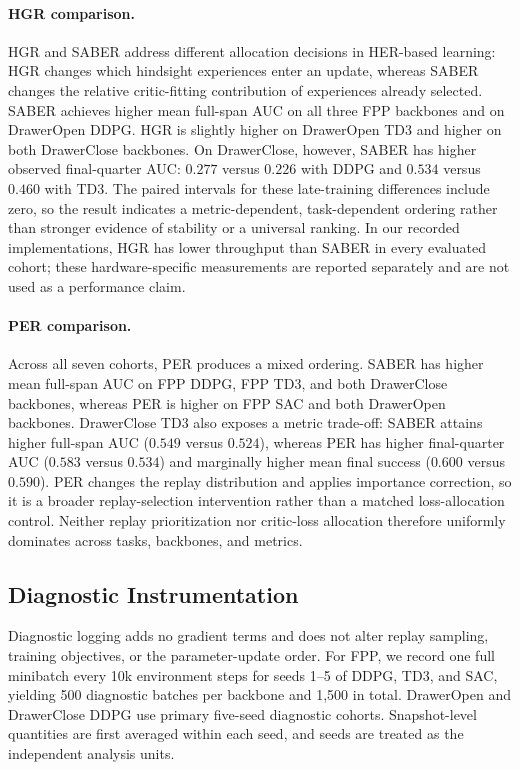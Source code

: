 \documentclass[letterpaper]{article}
\begin{document}
\paragraph{HGR comparison.}
HGR and SABER address different allocation decisions in HER-based learning: HGR changes which hindsight experiences enter an update, whereas SABER changes the relative critic-fitting contribution of experiences already selected. SABER achieves higher mean full-span AUC on all three FPP backbones and on DrawerOpen DDPG. HGR is slightly higher on DrawerOpen TD3 and higher on both DrawerClose backbones. On DrawerClose, however, SABER has higher observed final-quarter AUC: \(0.277\) versus \(0.226\) with DDPG and \(0.534\) versus \(0.460\) with TD3. The paired intervals for these late-training differences include zero, so the result indicates a metric-dependent, task-dependent ordering rather than stronger evidence of stability or a universal ranking. In our recorded implementations, HGR has lower throughput than SABER in every evaluated cohort; these hardware-specific measurements are reported separately and are not used as a performance claim.

\paragraph{PER comparison.}
Across all seven cohorts, PER produces a mixed ordering. SABER has higher mean full-span AUC on FPP DDPG, FPP TD3, and both DrawerClose backbones, whereas PER is higher on FPP SAC and both DrawerOpen backbones. DrawerClose TD3 also exposes a metric trade-off: SABER attains higher full-span AUC (\(0.549\) versus \(0.524\)), whereas PER has higher final-quarter AUC (\(0.583\) versus \(0.534\)) and marginally higher mean final success (\(0.600\) versus \(0.590\)). PER changes the replay distribution and applies importance correction, so it is a broader replay-selection intervention rather than a matched loss-allocation control. Neither replay prioritization nor critic-loss allocation therefore uniformly dominates across tasks, backbones, and metrics.

\subsection{Diagnostic Instrumentation}

Diagnostic logging adds no gradient terms and does not alter replay sampling, training objectives, or the parameter-update order. For FPP, we record one full minibatch every 10k environment steps for seeds 1--5 of DDPG, TD3, and SAC, yielding 500 diagnostic batches per backbone and 1,500 in total. DrawerOpen and DrawerClose DDPG use primary five-seed diagnostic cohorts. Snapshot-level quantities are first averaged within each seed, and seeds are treated as the independent analysis units.
\end{document}
